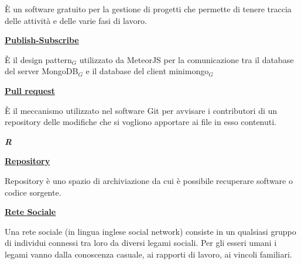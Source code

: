 \medskip
\begin{addmargin}[5em]{1em}	
È un software gratuito per la gestione di progetti che permette di tenere traccia delle attività e delle varie fasi di lavoro.
\end{addmargin}

\bigskip
\begin{addmargin}[0em]{0em}
	\textbf{\underline{Publish-Subscribe}} 
\end{addmargin}
	
\medskip
\begin{addmargin}[5em]{1em}
È il design pattern$_G$ utilizzato da MeteorJS per la comunicazione tra il database del server MongoDB$_G$ e il database del client minimongo$_G$
\end{addmargin}	

\bigskip
\begin{addmargin}[0em]{0em}
	\textbf{\underline{Pull request}} 
\end{addmargin}
	
\medskip
\begin{addmargin}[5em]{1em}
È il meccanismo utilizzato nel software Git per avvisare i contributori di un repository delle modifiche che si vogliono apportare ai file in esso contenuti.	
\end{addmargin}	

\newpage
	
\cleardoublepage
{}
{}
\noindent\hrulefill\hspace{4mm}\textbf{\textsl{\Huge{R}}}\hspace{4mm}\hrulefill

\vspace*{2\bigskipamount}

\bigskip
\begin{addmargin}[0em]{0em}	
	\textbf{\underline{Repository}}
\end{addmargin} 

\medskip
\begin{addmargin}[5em]{1em}
Repository è uno spazio di archiviazione da cui è possibile recuperare software o codice sorgente.
\end{addmargin}	

\bigskip
\begin{addmargin}[0em]{0em}	
	\textbf{\underline{Rete Sociale}} 
\end{addmargin}
	
\medskip
\begin{addmargin}[5em]{1em}
Una rete sociale (in lingua inglese social network) consiste in un qualsiasi gruppo di individui connessi tra loro da diversi legami sociali. Per gli esseri umani i legami vanno dalla conoscenza casuale, ai rapporti di lavoro, ai vincoli familiari.
\end{addmargin}	
	
